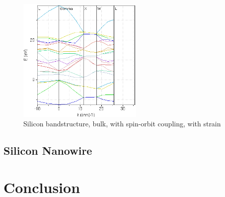 \documentclass{IEEEtran}
\begin{document}
\begin{figure}[!ht] 
    \centering
    \includegraphics*[width = 6cm]{si-bands-thirdset.png}
    \caption{Silicon bandstructure, bulk, with spin-orbit coupling, with strain}
    \label{fig:si-third-set}
\end{figure}    

\subsection{Silicon Nanowire}





\section{Conclusion}



\end{document}
